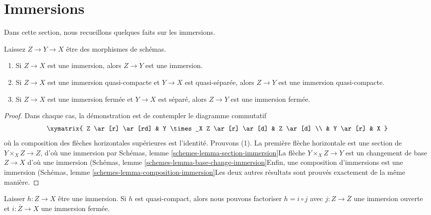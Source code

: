 \section{Immersions}
\label{section-immersions}

\noindent
Dans cette section, nous recueillons quelques faits sur les immersions.

\begin{lemma}

\label{lemma-immersion-permanence}
Laissez $Z \to Y \to X$ être des morphismes de schémas.
\begin{enumerate}
\item Si $Z \to X$ est une immersion, alors $Z \to Y$ est une immersion.
\item Si $Z \to X$ est une immersion quasi-compacte et $Y \to X$ est quasi-séparée, alors $Z \to Y$ est une immersion quasi-compacte.
\item Si $Z \to X$ est une immersion fermée et $Y \to X$ est séparé, alors $Z \to Y$ est une immersion fermée.
\end{enumerate}

\end{lemma}

\begin{proof}

Dans chaque cas, la démonstration est de contempler le diagramme commutatif
$$
\xymatrix{
Z \ar[r] \ar[rd] & Y \times_X Z \ar[r] \ar[d] & Z \ar[d] \\
& Y \ar[r] & X
}
$$
où la composition des flèches horizontales supérieures est l'identité. Prouvons (1). La première flèche horizontale est une section de
$Y \times_X Z \to Z$, d'où une immersion par Schémas, lemme \ref{schemes-lemma-section-immersion}La flèche $Y \times_X Z \to Y$ est un changement de base $Z \to X$ d'où une immersion (Schémas, lemme \ref{schemes-lemma-base-change-immersion}Enfin, une composition d'immersions est une immersion (Schémas, lemme \ref{schemes-lemma-composition-immersion}Les deux autres résultats sont prouvés exactement de la même manière.

\end{proof}

\begin{lemma}

\label{lemma-factor-quasi-compact-immersion}

Laisser $h : Z \to X$ être une immersion. Si $h$ est quasi-compact, alors nous pouvons factoriser
$h = i \circ j$ avec $j : Z \to \overline{Z}$ une immersion ouverte et $i : \overline{Z} \to X$ une immersion fermée.

\end{lemma}

